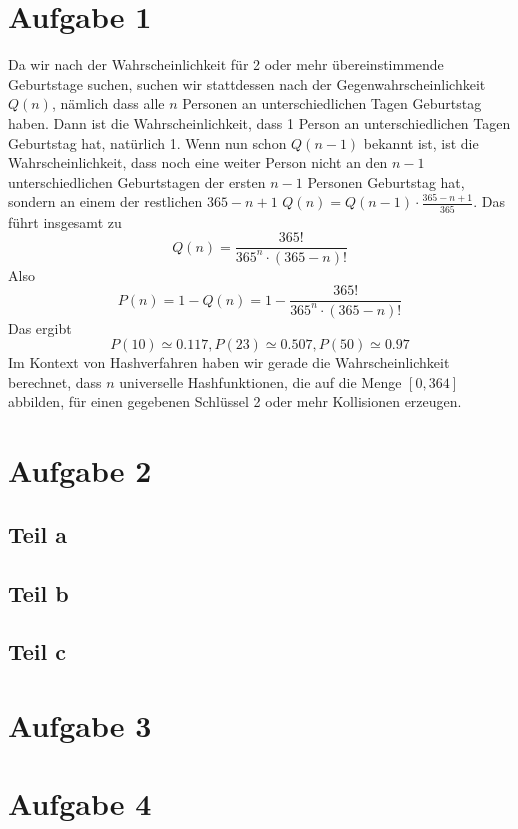 \documentclass[10pt,a4paper]{article}
\begin{document}
\section{Aufgabe 1}
Da wir nach der Wahrscheinlichkeit für 2 oder mehr übereinstimmende Geburtstage suchen, suchen wir stattdessen nach der Gegenwahrscheinlichkeit $Q(n)$, nämlich dass alle $n$ Personen an unterschiedlichen Tagen Geburtstag haben.
Dann ist die Wahrscheinlichkeit, dass 1 Person an unterschiedlichen Tagen Geburtstag hat, natürlich 1.
Wenn nun schon $Q(n - 1)$ bekannt ist, ist die Wahrscheinlichkeit, dass noch eine weiter Person nicht an den $n - 1$ unterschiedlichen Geburtstagen der ersten $n - 1$ Personen Geburtstag hat, sondern an einem der restlichen $365 - n + 1$ $Q(n) = Q(n - 1) \cdot \frac{365 - n + 1}{365}$.
Das führt insgesamt zu
\begin{equation}
  Q(n) = \frac{365!}{365^{n} \cdot (365 - n)!}
\end{equation}
Also
\begin{equation}
  P(n) = 1 - Q(n) = 1 - \frac{365!}{365^{n} \cdot (365 - n)!}
\end{equation}
Das ergibt
\begin{equation}
  P(10) \simeq 0.117, P(23) \simeq 0.507, P(50) \simeq 0.97
\end{equation}
Im Kontext von Hashverfahren haben wir gerade die Wahrscheinlichkeit berechnet, dass $n$ universelle Hashfunktionen, die auf die Menge $[0, 364]$ abbilden, für einen gegebenen Schlüssel 2 oder mehr Kollisionen erzeugen.

\section{Aufgabe 2}

\subsection{Teil a}

\subsection{Teil b}

\subsection{Teil c}

\section{Aufgabe 3}

\section{Aufgabe 4}
\end{document}
